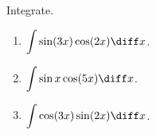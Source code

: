 Integrate.
\begin{enumerate}
\item $\displaystyle \int \sin (3 x) \cos (2x)\diff x$.
\item $\displaystyle \int \sin x \cos (5x)\diff x$.
\item $\displaystyle \int \cos (3x) \sin (2x)\diff x$.
\end{enumerate}
